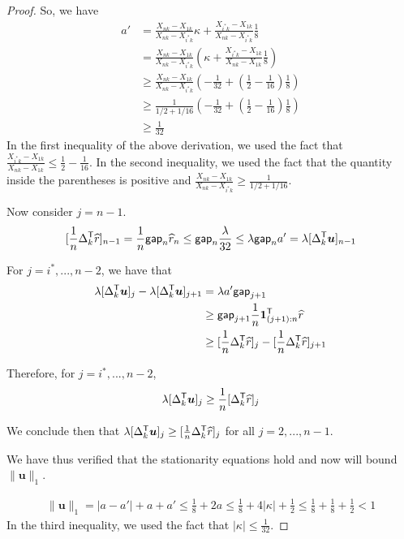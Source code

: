 \begin{proof}
So, we have 
\begin{align*}
a' &= \frac{X_{nk} - X_{1k}}{X_{nk} - X_{i^*k}} \kappa 
   + \frac{ X_{i^*k} - X_{1k}}{X_{nk} - X_{i^*k}} \frac{1}{8} \\
 &= \frac{X_{nk} - X_{1k}}{X_{nk} - X_{i^*k}} \left(
  \kappa + \frac{X_{i^*k} - X_{1k}}{X_{nk} - X_{1k}} \frac{1}{8} \right) \\
&\geq \frac{X_{nk} - X_{1k}}{X_{nk} - X_{i^*k}} \left(
  -\frac{1}{32} + (\frac{1}{2} - \frac{1}{16}) \frac{1}{8} \right) \\
&\geq \frac{1}{1/2 + 1/16} \left(
  -\frac{1}{32} + (\frac{1}{2} - \frac{1}{16}) \frac{1}{8} \right) \\
&\geq \frac{1}{32}
\end{align*}
In the first inequality of the above derivation, we used the fact that $\frac{X_{i^*k} - X_{1k}}{X_{nk} - X_{1k}} \leq \frac{1}{2} - \frac{1}{16}$. In the second inequality, we used the fact that the quantity inside the parentheses is positive and $\frac{X_{nk} - X_{1k}}{X_{nk} - X_{i^*k}} \geq \frac{1}{1/2 + 1/16}$.

Now consider $j=n-1$. 
\[
[ \frac{1}{n} \Delta_k^{\mathsf{T}} \widehat{r} ]_{n-1} = \frac{1}{n} \mathsf{gap}_n \widehat{r}_n 
 \leq \mathsf{gap}_n \frac{\lambda }{32} \leq \lambda \mathsf{gap}_n a' = \lambda [\Delta_k^{\mathsf{T}} \mbox{\boldmath $u$}]_{n-1} 
\]

For $j = i^*, ..., n-2$, we have that 
\begin{align*}
\lambda [\Delta_k^{\mathsf{T}} \mbox{\boldmath $u$} ]_j - \lambda [\Delta_k^{\mathsf{T}} \mbox{\boldmath $u$}]_{j+1} &= 
 \lambda a' \mathsf{gap}_{j+1}  \\
 &\geq \mathsf{gap}_{j+1} \frac{1}{n} \mbox{\boldmath $1$}_{(j+1):n}^{\mathsf{T}} \widehat{r}  \\
 &\geq  [\frac{1}{n} \Delta_k^{\mathsf{T}} \widehat{r}]_j - [\frac{1}{n} \Delta_k^{\mathsf{T}} \widehat{r}]_{j+1}
\end{align*}

Therefore, for $j = i^*,...,n-2$,
\begin{align*}
\lambda [\Delta_k^{\mathsf{T}} \mbox{\boldmath $u$}]_j \geq \frac{1}{n} [ \Delta_k^{\mathsf{T}} \widehat{r}]_j
\end{align*}

We conclude then that $\lambda [\Delta_k^{\mathsf{T}} \mbox{\boldmath $u$} ]_j \geq [\frac{1}{n} \Delta_k^{\mathsf{T}} \widehat{r}]_j$ for all $j = 2,...,n-1$. 

We have thus verified that the stationarity equations hold and now will bound $\| \mathbf{u} \|_1$.

\begin{align*}
\| \mathbf{u} \|_1 = | a - a'| + a + a' \leq \frac{1}{8} + 2 a \leq \frac{1}{8} + 4 |\kappa| + \frac{1}{2}  \leq \frac{1}{8} + \frac{1}{8} + \frac{1}{2} < 1
\end{align*}
In the third inequality, we used the fact that $|\kappa| \leq \frac{1}{32}$.


\end{proof}
